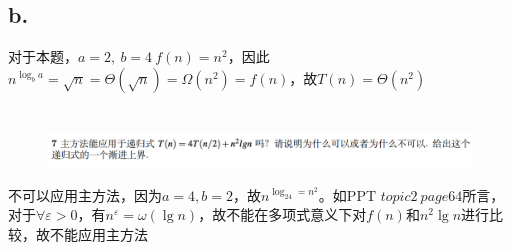 \documentclass[]{report}
\begin{document}
    \subsection{b.}
      对于本题，$a=2,\ b=4\ f(n)=n^2$，因此$n^{\log_ba}=\sqrt{n}=\Theta(\sqrt{n})=\Omega(n^2)=f(n)$，故$T(n)=\Theta(n^2)$

    \section{}%
    \begin{figure}[h]
      \centering
      \includegraphics[scale=0.3]{images/Pro_7.png}
    \end{figure}
    不可以应用主方法，因为$a=4,b=2$，故$n^{\log_24=n^2}$。如PPT $topic2\ page64$所言，对于$\forall\varepsilon>0$，有$n^{\varepsilon}=\omega(\lg n)$，故不能在多项式意义下对$f(n)$和$n^2\lg n$进行比较，故不能应用主方法
\end{document}
